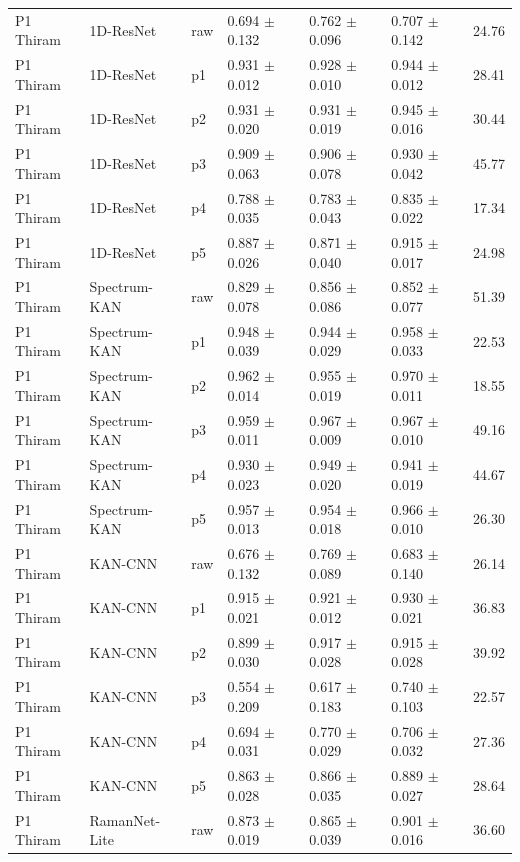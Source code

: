 {\begin{longtable}{L{2.35cm}L{2.4cm}L{1.0cm}L{2.35cm}L{2.25cm}L{2.25cm}L{1.45cm}}
P1 Thiram & 1D-ResNet & raw & 0.694 $\pm$ 0.132 & 0.762 $\pm$ 0.096 & 0.707 $\pm$ 0.142 & 24.76 \\
P1 Thiram & 1D-ResNet & p1 & 0.931 $\pm$ 0.012 & 0.928 $\pm$ 0.010 & 0.944 $\pm$ 0.012 & 28.41 \\
P1 Thiram & 1D-ResNet & p2 & 0.931 $\pm$ 0.020 & 0.931 $\pm$ 0.019 & 0.945 $\pm$ 0.016 & 30.44 \\
P1 Thiram & 1D-ResNet & p3 & 0.909 $\pm$ 0.063 & 0.906 $\pm$ 0.078 & 0.930 $\pm$ 0.042 & 45.77 \\
P1 Thiram & 1D-ResNet & p4 & 0.788 $\pm$ 0.035 & 0.783 $\pm$ 0.043 & 0.835 $\pm$ 0.022 & 17.34 \\
P1 Thiram & 1D-ResNet & p5 & 0.887 $\pm$ 0.026 & 0.871 $\pm$ 0.040 & 0.915 $\pm$ 0.017 & 24.98 \\
P1 Thiram & Spectrum-KAN & raw & 0.829 $\pm$ 0.078 & 0.856 $\pm$ 0.086 & 0.852 $\pm$ 0.077 & 51.39 \\
P1 Thiram & Spectrum-KAN & p1 & 0.948 $\pm$ 0.039 & 0.944 $\pm$ 0.029 & 0.958 $\pm$ 0.033 & 22.53 \\
P1 Thiram & Spectrum-KAN & p2 & 0.962 $\pm$ 0.014 & 0.955 $\pm$ 0.019 & 0.970 $\pm$ 0.011 & 18.55 \\
P1 Thiram & Spectrum-KAN & p3 & 0.959 $\pm$ 0.011 & 0.967 $\pm$ 0.009 & 0.967 $\pm$ 0.010 & 49.16 \\
P1 Thiram & Spectrum-KAN & p4 & 0.930 $\pm$ 0.023 & 0.949 $\pm$ 0.020 & 0.941 $\pm$ 0.019 & 44.67 \\
P1 Thiram & Spectrum-KAN & p5 & 0.957 $\pm$ 0.013 & 0.954 $\pm$ 0.018 & 0.966 $\pm$ 0.010 & 26.30 \\
P1 Thiram & KAN-CNN & raw & 0.676 $\pm$ 0.132 & 0.769 $\pm$ 0.089 & 0.683 $\pm$ 0.140 & 26.14 \\
P1 Thiram & KAN-CNN & p1 & 0.915 $\pm$ 0.021 & 0.921 $\pm$ 0.012 & 0.930 $\pm$ 0.021 & 36.83 \\
P1 Thiram & KAN-CNN & p2 & 0.899 $\pm$ 0.030 & 0.917 $\pm$ 0.028 & 0.915 $\pm$ 0.028 & 39.92 \\
P1 Thiram & KAN-CNN & p3 & 0.554 $\pm$ 0.209 & 0.617 $\pm$ 0.183 & 0.740 $\pm$ 0.103 & 22.57 \\
P1 Thiram & KAN-CNN & p4 & 0.694 $\pm$ 0.031 & 0.770 $\pm$ 0.029 & 0.706 $\pm$ 0.032 & 27.36 \\
P1 Thiram & KAN-CNN & p5 & 0.863 $\pm$ 0.028 & 0.866 $\pm$ 0.035 & 0.889 $\pm$ 0.027 & 28.64 \\
P1 Thiram & RamanNet-Lite & raw & 0.873 $\pm$ 0.019 & 0.865 $\pm$ 0.039 & 0.901 $\pm$ 0.016 & 36.60 \\

\end{longtable}}
